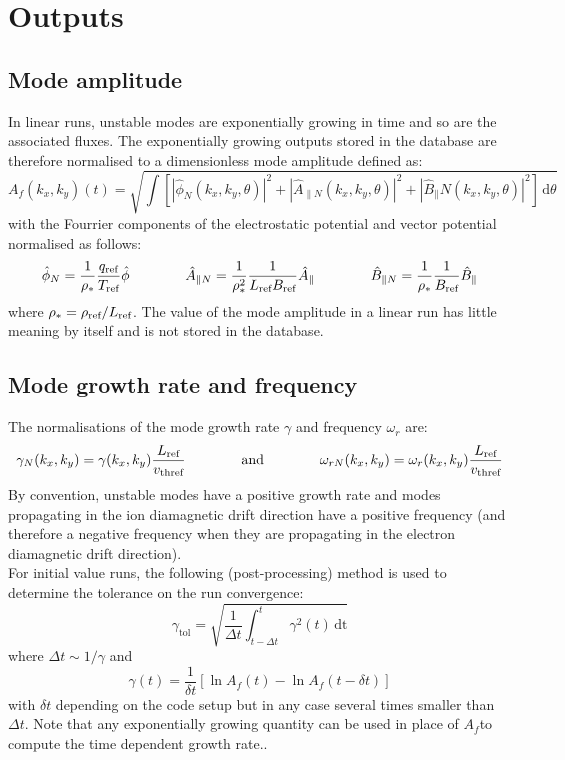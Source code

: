 \documentclass[fleqn]{report}
\begin{document}
\chapter{Outputs}
\section{Mode amplitude}
In linear runs, unstable modes are exponentially growing in time and so are the associated fluxes. 
The exponentially growing outputs stored in the database are therefore normalised to a dimensionless mode amplitude defined as:
\begin{equation}
 A_f(k_x,k_y)(t) = \sqrt{\int \left[|\hat{\phi}_N(k_x,k_y,\theta)|^2 + |\hat{A}_{\parallel N}(k_x,k_y,\theta)|^2  + |\hat{B}_\parallel N(k_x,k_y,\theta)|^2\right] \,\textrm{d}\theta}
\end{equation}
with the Fourrier components of the electrostatic potential and vector potential normalised as follows:
\begin{equation}
  \hat{\phi}_N = \frac{1}{\rho_*}\frac{q_{\textrm{ref}}}{T_{\textrm{ref}}} \hat{\phi} \qquad \qquad 
  \hat{A}_{\parallel N}=\frac{1}{\rho_*^2}\frac{1}{L_{\textrm{ref}} B_{\textrm{ref}}} \hat{A}_\parallel \qquad \qquad
  \hat{B}_{\parallel N}=\frac{1}{\rho_*}\frac{1}{B_{\textrm{ref}}} \hat{B}_\parallel
\end{equation}
where $\rho_*=\rho_{\textrm{ref}}/L_{\textrm{ref}}$.
The value of the mode amplitude in a linear run has little meaning by itself and is not stored in the database. 

\section{Mode growth rate and frequency}
The normalisations of the mode growth rate $\gamma$ and frequency $\omega_r$ are:
\begin{equation}
 \gamma_N(k_x,k_y) = \gamma(k_x,k_y) \frac{L_{\textrm{ref}}}{v_\textrm{thref}} \qquad \qquad \textrm{and} \qquad \qquad \omega_{rN}(k_x,k_y) = \omega_r(k_x,k_y) \frac{L_{\textrm{ref}}}{v_\textrm{thref}}
\end{equation}
By convention, unstable modes have a positive growth rate and modes propagating in the ion diamagnetic drift direction have a positive frequency (and therefore a negative frequency when they are propagating in the electron diamagnetic drift direction).\\

For initial value runs, the following (post-processing) method is used to determine the tolerance on the run convergence:
$$\gamma_\textrm{tol} = \sqrt{\frac{1}{\Delta t}\int_{t-\Delta t}^t \gamma^2(t)\,\textrm{dt}}$$
where $\Delta t \sim 1/\gamma$ and
$$\gamma(t)=\frac{1}{\delta t}[\ln{A_f(t)}-\ln{A_f(t-\delta t)}]$$
with $\delta t$ depending on the code setup but in any case several times smaller than $\Delta t$. Note that any exponentially growing quantity can be used in place of $A_f$to compute the time dependent growth rate..
\end{document}
